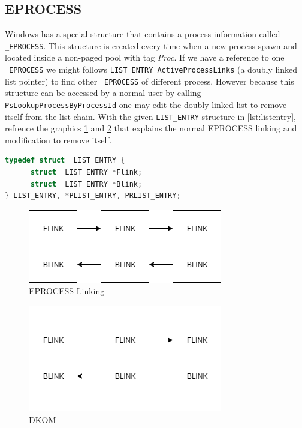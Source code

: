 \subsection[EPROCESS]{EPROCESS}

Windows has a special structure that contains a process information called \texttt{\_EPROCESS}. This structure is created every time when a new process spawn and located inside a non-paged pool with tag \textit{Proc}. If we have a reference to one \texttt{\_EPROCESS} we might follows \texttt{LIST\_ENTRY ActiveProcessLinks} (a doubly linked list pointer) to find other \texttt{\_EPROCESS} of different process. However because this structure can be accessed by a normal user by calling \texttt{PsLookupProcessByProcessId} one may edit the doubly linked list to remove itself from the list chain. With the given \texttt{LIST\_ENTRY} structure in \ref{lst:listentry}, refrence the graphics \ref{fig:eprocesslink} and \ref{fig:dkom} that explains the normal EPROCESS linking and modification to remove itself.

\begin{lstlisting}[language=c,caption={LIST\_ENTRY},label={lst:listentry}]
typedef struct _LIST_ENTRY {
      struct _LIST_ENTRY *Flink;
      struct _LIST_ENTRY *Blink;
} LIST_ENTRY, *PLIST_ENTRY, PRLIST_ENTRY;
\end{lstlisting}

\begin{figure}
\centering
\caption{EPROCESS Linking}
\label{fig:eprocesslink}
\includegraphics[]{images/eprocess_link.png}
\end{figure}

\begin{figure}
\centering
\caption{DKOM}
\label{fig:dkom}
\includegraphics[]{images/dkom.png}
\end{figure}

